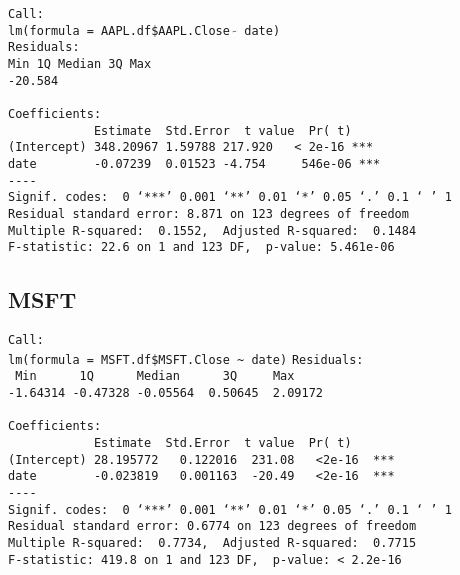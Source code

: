 \documentclass{article}[14pt]
\begin{document}
\begin{multicols}{2}
\texttt{Call: \\
lm(formula = AAPL.df\$AAPL.Close $\tilde{}$ date)\\
Residuals:\\
Min \hspace{35pt} 1Q \qquad Median \qquad 3Q \qquad  Max\\
-20.584       \\}
\verb| |\\
\verb|Coefficients:|\\
\verb|            Estimate  Std.Error  t value  Pr( t)|\\
\verb|(Intercept) 348.20967 1.59788 217.920   < 2e-16 ***|\\
\verb|date        -0.07239  0.01523 -4.754     546e-06 ***|\\
\verb|----|\\
\verb|Signif. codes:  0 ‘***’ 0.001 ‘**’ 0.01 ‘*’ 0.05 ‘.’ 0.1 ‘ ’ 1|\\
\verb|Residual standard error: 8.871 on 123 degrees of freedom|\\
\verb|Multiple R-squared:  0.1552,	Adjusted R-squared:  0.1484|\\
\verb|F-statistic: 22.6 on 1 and 123 DF,  p-value: 5.461e-06|

\subsection{MSFT}
\verb|Call:|\\
\verb|lm(formula = MSFT.df$MSFT.Close ~ date)|
\verb|Residuals:|\\
\verb| Min      1Q      Median      3Q     Max |\\
\verb|-1.64314 -0.47328 -0.05564  0.50645  2.09172|\\
\verb| |\\
\verb|Coefficients:|\\
\verb|            Estimate  Std.Error  t value  Pr( t)|\\
\verb|(Intercept) 28.195772   0.122016  231.08   <2e-16  ***|\\
\verb|date        -0.023819   0.001163  -20.49   <2e-16  ***|\\
\verb|----|\\
\verb|Signif. codes:  0 ‘***’ 0.001 ‘**’ 0.01 ‘*’ 0.05 ‘.’ 0.1 ‘ ’ 1|\\
\verb|Residual standard error: 0.6774 on 123 degrees of freedom|\\
\verb|Multiple R-squared:  0.7734,	Adjusted R-squared:  0.7715|\\
\verb|F-statistic: 419.8 on 1 and 123 DF,  p-value: < 2.2e-16|

\end{multicols}
\end{document}
